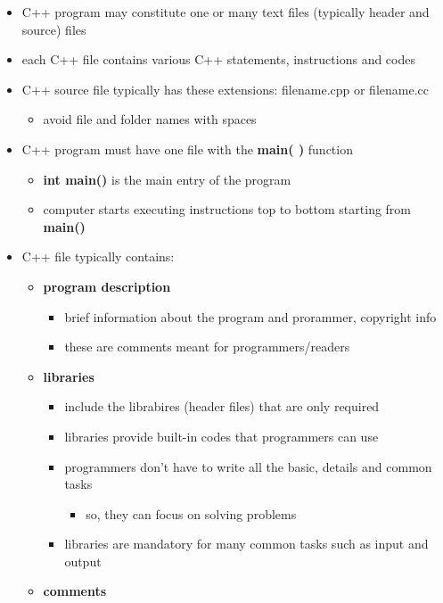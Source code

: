 \documentclass[11pt]{article}
\providecommand{\tightlist}{%
      \setlength{\itemsep}{0pt}\setlength{\parskip}{0pt}}
\begin{document}
\begin{itemize}
\tightlist
\item
  C++ program may constitute one or many text files (typically header
  and source) files
\item
  each C++ file contains various C++ statements, instructions and codes
\item
  C++ source file typically has these extensions: filename.cpp or
  filename.cc

  \begin{itemize}
  \tightlist
  \item
    avoid file and folder names with spaces
  \end{itemize}
\item
  C++ program must have one file with the \textbf{main( )} function

  \begin{itemize}
  \tightlist
  \item
    \textbf{int main()} is the main entry of the program
  \item
    computer starts executing instructions top to bottom starting from
    \textbf{main()}
  \end{itemize}
\item
  C++ file typically contains:

  \begin{itemize}
  \tightlist
  \item
    \textbf{program description}

    \begin{itemize}
    \tightlist
    \item
      brief information about the program and prorammer, copyright info
    \item
      these are comments meant for programmers/readers
    \end{itemize}
  \item
    \textbf{libraries}

    \begin{itemize}
    \tightlist
    \item
      include the librabires (header files) that are only required
    \item
      libraries provide built-in codes that programmers can use
    \item
      programmers don't have to write all the basic, details and common
      tasks

      \begin{itemize}
      \tightlist
      \item
        so, they can focus on solving problems
      \end{itemize}
    \item
      libraries are mandatory for many common tasks such as input and
      output
    \end{itemize}
  \item
    \textbf{comments}


\end{itemize}
\end{itemize}
\end{document}
